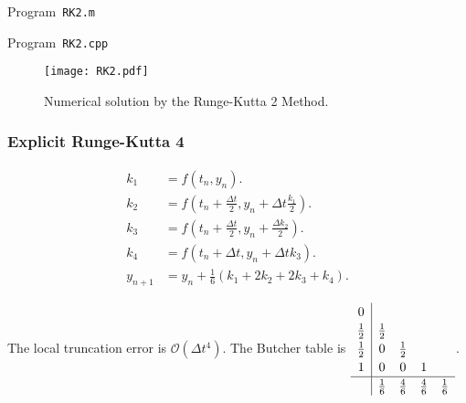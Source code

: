 \begin{listing}[ht!]
	\tiny
	\centering
	\caption{Program~\texttt{RK2.m}}
	\label{code:RK2.m}
\end{listing}

\begin{listing}[ht!]
	\tiny
	\centering
	\caption{Program~\texttt{RK2.cpp}}
	\label{code:RK2.cpp}
\end{listing}

\begin{figure}[ht!]
	\centering
	\texttt{[image: RK2.pdf]}
	\caption{Numerical solution by the Runge-Kutta 2 Method.}
\end{figure}

\subsubsection{Explicit Runge-Kutta 4}

\begin{align*}
	k_{1}   & =
	f\left(t_{n},y_{n}\right).                                            \\
	k_{2}   & =
	f\left(t_{n}+\frac{\Delta t}{2},y_{n}+\Delta t\frac{k_{1}}{2}\right). \\
	k_{3}   & =
	f\left(t_{n}+\frac{\Delta t}{2},y_{n}+\frac{\Delta k_{2}}{2}\right).  \\
	k_{4}   & =
	f\left(t_{n}+\Delta t,y_{n}+\Delta t k_{3}\right).                    \\
	y_{n+1} & =
	y_{n}+
	\frac{1}{6}\left(k_{1}+2k_{2}+2k_{3}+k_{4}\right).
\end{align*}

The local truncation error is
\begin{math}
	\mathcal{O}
	\left(\Delta t^{4}\right)
\end{math}.
The Butcher table is
\begin{math}
	\renewcommand\arraystretch{1.2}
	\begin{array}
		{c|cccc}
		0           &             &             &             &             \\
		\frac{1}{2} & \frac{1}{2} &             &             &             \\
		\frac{1}{2} & 0           & \frac{1}{2} &             &             \\
		1           & 0           & 0           & 1           &             \\
		\hline
		            & \frac{1}{6} & \frac{4}{6} & \frac{4}{6} & \frac{1}{6}
	\end{array}
\end{math}.

